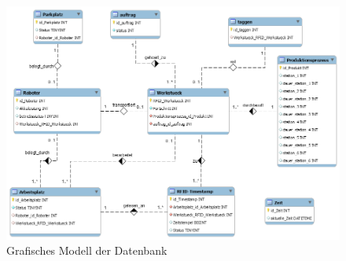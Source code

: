 \begin{figure}[ht]
	    \centering
	    \includegraphics[width=1\linewidth]{Bilder/DB_Modell.png}
        \caption{Grafisches Modell der Datenbank}
        \label{fig:ER-Diagramm_Worbenche}
\end{figure}
 
